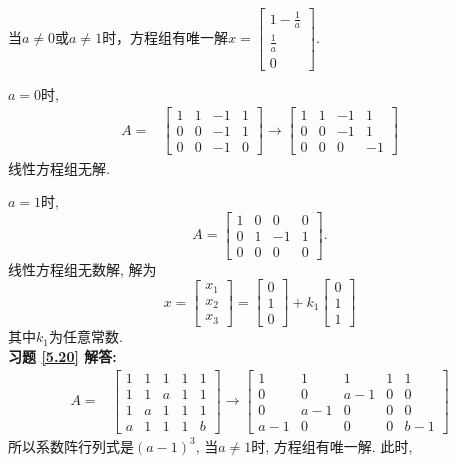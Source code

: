 当$a\not=0$或$a\not=1$时，方程组有唯一解$x=\begin{bmatrix}1-\frac{1}{a}\\ \frac{1}{a}\\0\end{bmatrix}.$

$a=0$时,
 \begin{displaymath}
\begin{aligned}
A=&\begin{bmatrix} 1&1&-1&1\\0&0&-1&1\\0&0&-1&0  \end{bmatrix}\rightarrow
\begin{bmatrix} 1&1&-1&1\\0&0&-1&1\\0&0&0&-1  \end{bmatrix}\end{aligned} \end{displaymath}
线性方程组无解.

$a=1$时,$$A=\begin{bmatrix}1&0&0&0\\0&1&-1&1\\0&0&0&0\end{bmatrix}.$$
线性方程组无数解, 解为
\begin{displaymath}
x=\begin{bmatrix}x_1\\x_2\\x_3\end{bmatrix}=\begin{bmatrix}0\\1\\0\end{bmatrix}+k_1
\begin{bmatrix}0\\1\\1\end{bmatrix}\end{displaymath}
其中$k_1$为任意常数.\\
\textbf{习题 \ref{5.20} 解答:}\\
 \begin{displaymath}
\begin{aligned}
A=&\begin{bmatrix} 1&1&1&1&1\\1&1&a&1&1\\1&a&1&1&1\\a&1&1&1&b \end{bmatrix}\rightarrow
\begin{bmatrix} 1&1&1&1&1\\0&0&a-1&0&0\\0&a-1&0&0&0\\a-1&0&0&0&b-1 \end{bmatrix}\end{aligned} \end{displaymath}
所以系数阵行列式是$(a-1)^3$, 当$a\not=1$时, 方程组有唯一解. 此时,

